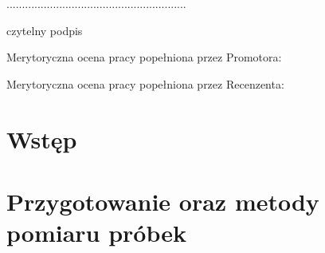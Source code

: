\documentclass[a4paper,12pt]{article}
\numberwithin{equation}{section}
\begin{document}
\vspace{5ex}
\begin{flushright}
  ..........................................................
  
  czytelny podpis
\end{flushright}

\newpage





\newpage
Merytoryczna ocena pracy popełniona przez Promotora:

\newpage
Merytoryczna ocena pracy popełniona przez Recenzenta:

\newpage
\begin{center}
\tableofcontents
\end{center}

\newpage
\section{Wstęp}


\newpage
\section{Przygotowanie oraz metody pomiaru próbek}
\end{document}
